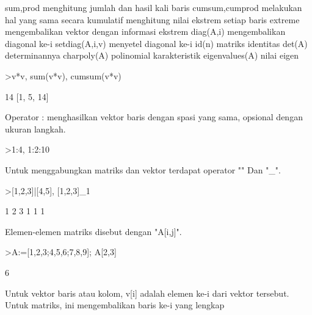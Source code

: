 \begin{eulernotebook}
\begin{eulercomment}
\begin{eulercomment}
\begin{eulercomment}
\end{eulercomment}
\begin{eulerttcomment}
   sum,prod menghitung jumlah dan hasil kali baris
   cumsum,cumprod melakukan hal yang sama secara kumulatif
   menghitung nilai ekstrem setiap baris
   extreme mengembalikan vektor dengan informasi ekstrem
   diag(A,i) mengembalikan diagonal ke-i
   setdiag(A,i,v) menyetel diagonal ke-i
   id(n) matriks identitas
   det(A) determinannya
   charpoly(A) polinomial karakteristik
   eigenvalues(A) nilai eigen
\end{eulerttcomment}
\begin{eulerprompt}
>v*v, sum(v*v), cumsum(v*v)
\end{eulerprompt}
\begin{euleroutput}
  [1,  4,  9]
  14
  [1,  5,  14]
\end{euleroutput}
\begin{eulercomment}
Operator : menghasilkan vektor baris dengan spasi yang sama, opsional
dengan ukuran langkah.
\end{eulercomment}
\begin{eulerprompt}
>1:4, 1:2:10
\end{eulerprompt}
\begin{euleroutput}
  [1,  2,  3,  4]
  [1,  3,  5,  7,  9]
\end{euleroutput}
\begin{eulercomment}
Untuk menggabungkan matriks dan vektor terdapat operator "\textbar{}" Dan "\_".
\end{eulercomment}
\begin{eulerprompt}
>[1,2,3]|[4,5], [1,2,3]_1
\end{eulerprompt}
\begin{euleroutput}
  [1,  2,  3,  4,  5]
              1             2             3 
              1             1             1 
\end{euleroutput}
\begin{eulercomment}
Elemen-elemen matriks disebut dengan "A[i,j]".
\end{eulercomment}
\begin{eulerprompt}
>A:=[1,2,3;4,5,6;7,8,9]; A[2,3]
\end{eulerprompt}
\begin{euleroutput}
  6
\end{euleroutput}
\begin{eulercomment}
Untuk vektor baris atau kolom, v[i] adalah elemen ke-i dari vektor
tersebut. Untuk matriks, ini mengembalikan baris ke-i yang lengkap

\end{eulercomment}
\end{eulercomment}
\end{eulercomment}
\end{eulernotebook}
